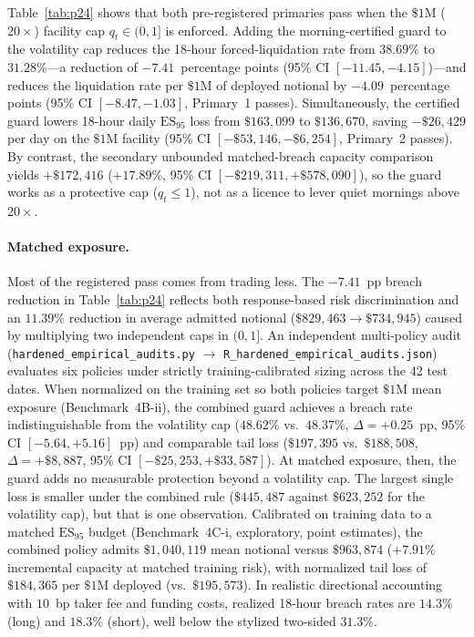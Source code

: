 \documentclass[12pt]{article}
\theoremstyle{definition}
\theoremstyle{remark}
\begin{document}
Table~\ref{tab:p24} shows that both pre-registered primaries pass when the $\$1\text{M}$ ($20\times$) facility cap $q_t\in(0,1]$ is enforced. Adding the morning-certified guard to the volatility cap reduces the 18-hour forced-liquidation rate from $38.69\%$ to $31.28\%$---a reduction of $-7.41$~percentage points (95\% CI $[-11.45,-4.15]$)---and reduces the liquidation rate per $\$1\text{M}$ of deployed notional by $-4.09$~percentage points (95\% CI $[-8.47,-1.03]$, Primary~1 passes). Simultaneously, the certified guard lowers 18-hour daily $\mathrm{ES}_{95}$ loss from $\$163{,}099$ to $\$136{,}670$, saving $-\$26{,}429$ per day on the $\$1\text{M}$ facility (95\% CI $[-\$53{,}146,-\$6{,}254]$, Primary~2 passes). By contrast, the secondary unbounded matched-breach capacity comparison yields $+\$172{,}416$ ($+17.89\%$, 95\% CI $[-\$219{,}311,+\$578{,}090]$), so the guard works as a protective cap ($q_t\le 1$), not as a licence to lever quiet mornings above $20\times$.

\paragraph{Matched exposure.} Most of the registered pass comes from trading less. The $-7.41$~pp breach reduction in Table~\ref{tab:p24} reflects both response-based risk discrimination and an $11.39\%$ reduction in average admitted notional ($\$829{,}463 \to \$734{,}945$) caused by multiplying two independent caps in $(0,1]$. An independent multi-policy audit (\texttt{hardened\_empirical\_audits.py} $\to$ \texttt{R\_hardened\_empirical\_audits.json}) evaluates six policies under strictly training-calibrated sizing across the 42 test dates. When normalized on the training set so both policies target $\$1\text{M}$ mean exposure (Benchmark~4B-ii), the combined guard achieves a breach rate indistinguishable from the volatility cap ($48.62\%$ vs.\ $48.37\%$, $\Delta=+0.25$~pp, 95\% CI $[-5.64,+5.16]$~pp) and comparable tail loss ($\$197{,}395$ vs.\ $\$188{,}508$, $\Delta=+\$8{,}887$, 95\% CI $[-\$25{,}253,+\$33{,}587]$). At matched exposure, then, the guard adds no measurable protection beyond a volatility cap. The largest single loss is smaller under the combined rule ($\$445{,}487$ against $\$623{,}252$ for the volatility cap), but that is one observation. Calibrated on training data to a matched $\mathrm{ES}_{95}$ budget (Benchmark~4C-i, exploratory, point estimates), the combined policy admits $\$1{,}040{,}119$ mean notional versus $\$963{,}874$ ($+7.91\%$ incremental capacity at matched training risk), with normalized tail loss of $\$184{,}365$ per $\$1\text{M}$ deployed (vs.\ $\$195{,}573$). In realistic directional accounting with $10$~bp taker fee and funding costs, realized 18-hour breach rates are $14.3\%$ (long) and $18.3\%$ (short), well below the stylized two-sided $31.3\%$.
\end{document}
